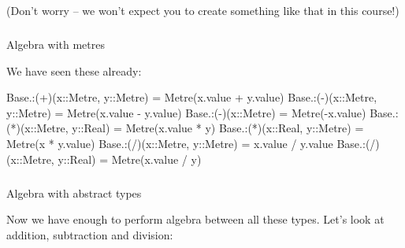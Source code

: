 \documentclass[
]{article}
\makeatletter
\let\oldsubparagraph\subparagraph
\renewcommand{\subparagraph}{
    \@ifstar
      \xxxSubParagraphStar
      \xxxSubParagraphNoStar
  }
\newcommand{\xxxSubParagraphStar}[1]{\oldsubparagraph*{#1}\mbox{}}
\newcommand{\xxxSubParagraphNoStar}[1]{\oldsubparagraph{#1}\mbox{}}
\newenvironment{Shaded}{\begin{snugshade}}{\end{snugshade}}
\newcommand{\BuiltInTok}[1]{\textcolor[rgb]{0.00,0.23,0.31}{#1}}
\newcommand{\DataTypeTok}[1]{\textcolor[rgb]{0.68,0.00,0.00}{#1}}
\newcommand{\FunctionTok}[1]{\textcolor[rgb]{0.28,0.35,0.67}{#1}}
\newcommand{\NormalTok}[1]{\textcolor[rgb]{0.00,0.23,0.31}{#1}}
\newcommand{\OperatorTok}[1]{\textcolor[rgb]{0.37,0.37,0.37}{#1}}
\makeatother
\begin{document}
(Don't worry -- we won't expect you to create something like that in
this course!)

\subparagraph{Algebra with metres}\label{algebra-with-metres}

We have seen these already:

\begin{Shaded}
\begin{Highlighting}[]
\BuiltInTok{Base}\NormalTok{.}\OperatorTok{:}\NormalTok{(}\OperatorTok{+}\NormalTok{)(x}\OperatorTok{::}\DataTypeTok{Metre}\NormalTok{, y}\OperatorTok{::}\DataTypeTok{Metre}\NormalTok{) }\OperatorTok{=} \FunctionTok{Metre}\NormalTok{(x.value }\OperatorTok{+}\NormalTok{ y.value)}
\BuiltInTok{Base}\NormalTok{.}\OperatorTok{:}\NormalTok{(}\OperatorTok{{-}}\NormalTok{)(x}\OperatorTok{::}\DataTypeTok{Metre}\NormalTok{, y}\OperatorTok{::}\DataTypeTok{Metre}\NormalTok{) }\OperatorTok{=} \FunctionTok{Metre}\NormalTok{(x.value }\OperatorTok{{-}}\NormalTok{ y.value)}
\BuiltInTok{Base}\NormalTok{.}\OperatorTok{:}\NormalTok{(}\OperatorTok{{-}}\NormalTok{)(x}\OperatorTok{::}\DataTypeTok{Metre}\NormalTok{) }\OperatorTok{=} \FunctionTok{Metre}\NormalTok{(}\OperatorTok{{-}}\NormalTok{x.value)}
\BuiltInTok{Base}\NormalTok{.}\OperatorTok{:}\NormalTok{(}\OperatorTok{*}\NormalTok{)(x}\OperatorTok{::}\DataTypeTok{Metre}\NormalTok{, y}\OperatorTok{::}\DataTypeTok{Real}\NormalTok{) }\OperatorTok{=} \FunctionTok{Metre}\NormalTok{(x.value }\OperatorTok{*}\NormalTok{ y)}
\BuiltInTok{Base}\NormalTok{.}\OperatorTok{:}\NormalTok{(}\OperatorTok{*}\NormalTok{)(x}\OperatorTok{::}\DataTypeTok{Real}\NormalTok{, y}\OperatorTok{::}\DataTypeTok{Metre}\NormalTok{) }\OperatorTok{=} \FunctionTok{Metre}\NormalTok{(x }\OperatorTok{*}\NormalTok{ y.value)}
\BuiltInTok{Base}\NormalTok{.}\OperatorTok{:}\NormalTok{(}\OperatorTok{/}\NormalTok{)(x}\OperatorTok{::}\DataTypeTok{Metre}\NormalTok{, y}\OperatorTok{::}\DataTypeTok{Metre}\NormalTok{) }\OperatorTok{=}\NormalTok{ x.value }\OperatorTok{/}\NormalTok{ y.value}
\BuiltInTok{Base}\NormalTok{.}\OperatorTok{:}\NormalTok{(}\OperatorTok{/}\NormalTok{)(x}\OperatorTok{::}\DataTypeTok{Metre}\NormalTok{, y}\OperatorTok{::}\DataTypeTok{Real}\NormalTok{) }\OperatorTok{=} \FunctionTok{Metre}\NormalTok{(x.value }\OperatorTok{/}\NormalTok{ y)}
\end{Highlighting}
\end{Shaded}

\subparagraph{Algebra with abstract
types}\label{algebra-with-abstract-types}

Now we have enough to perform algebra between all these types. Let's
look at addition, subtraction and division:
\end{document}
